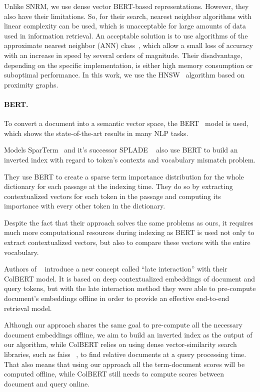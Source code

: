 \documentclass[
    twocolumn,
]{template/ceurart}
\begin{document}
    Unlike SNRM, we use dense vector BERT-based representations.
    However, they also have their limitations.
    So, for their search, nearest neighbor algorithms with linear complexity can be used,
    which is unacceptable for large amounts of data used in information retrieval.
    An acceptable solution is to use algorithms of the approximate nearest neighbor (ANN) class~\cite{ann},
    which allow a small loss of accuracy with an increase in speed by several orders of magnitude.
    Their disadvantage, depending on the specific implementation,
    is either high memory consumption or suboptimal performance.
    In this work, we use the HNSW~\cite{hnsw} algorithm based on proximity graphs.

    \paragraph{BERT.}
    To convert a document into a semantic vector space, the BERT~\cite{devlin2018bert} model is used,
    which shows the state-of-the-art results in many NLP tasks.

    Models SparTerm~\cite{sparTerm} and it's successor SPLADE ~\cite{splade} also use BERT to build an inverted
    index with regard to token's contexts and vocabulary mismatch problem.

    They use BERT to create a sparse term importance distribution for the whole dictionary for each passage at the indexing time.
    They do so by extracting contextualized vectors for each token in the passage and computing its importance with every other
    token in the dictionary.

    Despite the fact that their approach solves the same problems as ours, it requires much more computational resources during indexing
    as BERT is used not only to extract contextualized vectors, but also to compare these vectors with the
    entire vocabulary.

    Authors of ~\cite{colbert} introduce a new concept called ``late interaction'' with their ColBERT model.
    It is based on deep contextualized embeddings of document and query tokens, but with the late interaction
    method they were able to pre-compute document's embeddings offline in order to provide an effective end-to-end retrieval model.

    Although our approach shares the same goal to pre-compute all the necessary document embeddings offline, we aim to
    build an inverted index as the output of our algorithm, while ColBERT relies on using dense vector-similarity search libraries,
    such as faiss ~\cite{faiss}, to find relative documents at a query processing time.
    That also means that using our approach all the term-document scores will be computed offline,
    while ColBERT still needs to compute scores between document and query online.
\end{document}
